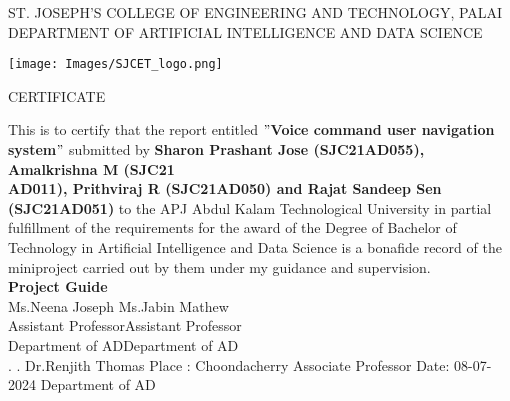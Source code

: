 \newpage
\thispagestyle{empty}
\begin{center}
\normalsize{ST. JOSEPH’S COLLEGE OF ENGINEERING AND TECHNOLOGY, PALAI}\\[0.5cm]
\normalsize
 { DEPARTMENT OF ARTIFICIAL INTELLIGENCE AND DATA SCIENCE}\\[1.0cm]%
   \begin{center}
   \texttt{[image: Images/SJCET\_logo.png]}
   \end{center}
{\large CERTIFICATE}\\[1.5cm]
\end{center}
\normalsize 
This is to certify that the report entitled {\bf $"$Voice command user navigation system$"$} submitted by { \bf Sharon Prashant Jose (SJC21AD055), Amalkrishna M (SJC21\\AD011), Prithviraj R (SJC21AD050) and Rajat Sandeep Sen (SJC21AD051)} to the APJ Abdul Kalam Technological University in partial fulfillment of the requirements for the award of the Degree of Bachelor of Technology in Artificial Intelligence and Data Science is a bonafide record of the miniproject carried out by them under my guidance and supervision.\vspace{1.2 cm}\\
{\bf Project Guide}\hspace{8.35 cm}{\bf Project Coordinator}\\
Ms.Neena Joseph\hspace{8.0 cm} Ms.Jabin Mathew\\
Assistant Professor\hspace{7.76 cm}Assistant Professor\hspace{2.7 cm}\\Department of AD\hspace{7.8 cm}Department of AD
\vspace{1.0 cm}\\
.\hspace{11.06 cm}{\bf Head of the Department}
\newline
.\hspace{11.01 cm} Dr.Renjith Thomas
\newline
Place : Choondacherry  \hspace{6.87 cm} Associate Professor
\newline
Date\hspace{0.25 cm}: 08-07-2024 \hspace{7.7 cm} Department of AD
                
